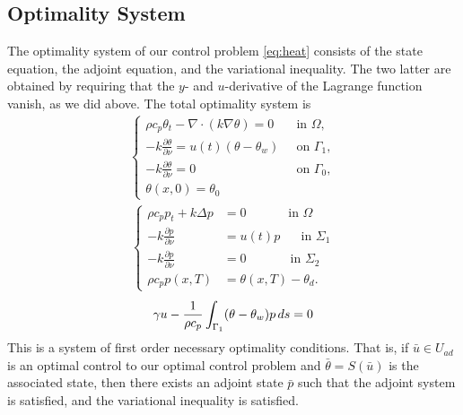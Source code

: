 \subsection{Optimality System}
The optimality system of our control problem \eqref{eq:heat} consists of the state equation, the adjoint equation, and the variational inequality. The two latter are obtained by requiring that the $y$- and $u$-derivative of the Lagrange function vanish, as we did above. The total optimality system is
%
\begin{align*}
    \begin{cases}
     \rho c_p \theta_t - \nabla \cdot (k \nabla \theta) = 0 \quad & \text{in $\Omega$}, \\
      -k \frac{\partial \theta}{\partial \nu} = u(t) (\theta - \theta_w) &\text{on } \Gamma_1, \\
      -k \frac{\partial \theta}{\partial \nu} = 0  &\text{on } \Gamma_0, \\
      \theta(x, 0) = \theta_0 
      \end{cases}
      \end{align*}
      \begin{align*}
      \begin{cases}
       \rho c_p p_t + k\Delta p &= 0 \quad\qquad\textrm{ in } \Omega \\
      -k\frac{\partial p}{\partial\nu} &= u(t)p \,\,\quad\textrm{ in } \Sigma_1 \\
      -k\frac{\partial p}{\partial\nu} &= 0 \,\quad\qquad\textrm{ in } \Sigma_2 \\
      \rho c_p p(x, T) &= \theta(x, T) - \theta_d.
      \end{cases}
      \end{align*}
\begin{equation*}
      \gamma u - \frac{1}{\rho c_p} \int_{\Gamma_1} (\theta - \theta_w)p \mathop{ds} =0
\end{equation*}
%
This is a system of first order necessary optimality conditions. That is, if $\bar{u} \in U_{ad}$ is an optimal control to our optimal control problem and $\bar{\theta} = S(\bar{u})$ is the associated state, then there exists an adjoint state $\bar{p}$ such that the adjoint system is satisfied, and the variational inequality is satisfied. 



\iffalse
Now one can restate this optimalilty system using the projection formula if one assume box-constraints. That is, if we assume
\begin{equation*}
    U_{\mathrm{ad}} := \{ u \in L^2(\Sigma_1): u_a(x,t) \leq u(x,t) \leq u_b(x,t) \text{ for a.e. } (x,t) \in \Sigma_1 \},
\end{equation*}
then a control $\bar{u} \in U_{\mathrm{ad}}$ and the associated state $\bar{\theta}$ is optimal if and only if it satisfy together with the adjoint state $p$ solving \eqref{eq:adjoint-eqn}  and $\gamma >0$ i.e. the regularisation parameter is positive that
\fi

